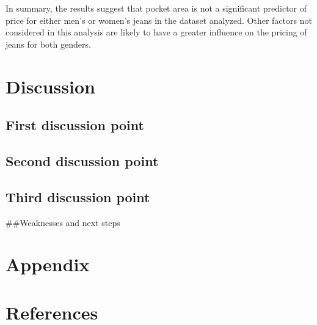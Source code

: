 \documentclass[
  letterpaper,
  DIV=11,
  numbers=noendperiod]{scrartcl}
\begin{document}
In summary, the results suggest that pocket area is not a significant
predictor of price for either men's or women's jeans in the dataset
analyzed. Other factors not considered in this analysis are likely to
have a greater influence on the pricing of jeans for both genders.

\hypertarget{discussion}{%
\section{Discussion}\label{discussion}}

\hypertarget{sec-first-point}{%
\subsection{First discussion point}\label{sec-first-point}}

\hypertarget{second-discussion-point}{%
\subsection{Second discussion point}\label{second-discussion-point}}

\hypertarget{third-discussion-point}{%
\subsection{Third discussion point}\label{third-discussion-point}}

\#\#Weaknesses and next steps

\newpage

\appendix

\hypertarget{appendix}{%
\section*{Appendix}\label{appendix}}

\newpage

\hypertarget{references}{%
\section*{References}\label{references}}
\end{document}

